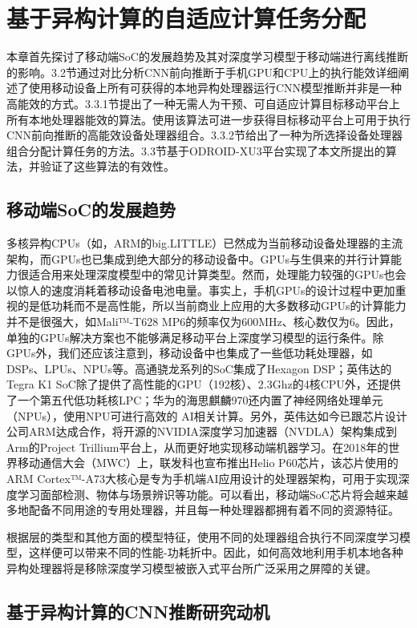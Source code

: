 \chapter{基于异构计算的自适应计算任务分配}

本章首先探讨了移动端SoC的发展趋势及其对深度学习模型于移动端进行离线推断的影响。3.2节通过对比分析CNN前向推断于手机GPU和CPU上的执行能效详细阐述了使用移动设备上所有可获得的本地异构处理器运行CNN模型推断并非是一种高能效的方式。3.3.1节提出了一种无需人为干预、可自适应计算目标移动平台上所有本地处理器能效的算法。使用该算法可进一步获得目标移动平台上可用于执行CNN前向推断的高能效设备处理器组合。3.3.2节给出了一种为所选择设备处理器组合分配计算任务的方法。3.3节基于ODROID-XU3平台实现了本文所提出的算法，并验证了这些算法的有效性。

\section{移动端SoC的发展趋势}
\label{chapter:chapter4-1}
多核异构CPUs（如，ARM的big.LITTLE\cite{chung2012heterogeneous}）已然成为当前移动设备处理器的主流架构，而GPUs也已集成到绝大部分的移动设备中。GPUs与生俱来的并行计算能力很适合用来处理深度模型中的常见计算类型。然而，处理能力较强的GPUs也会以惊人的速度消耗着移动设备电池电量。事实上，手机GPUs的设计过程中更加重视的是低功耗而不是高性能，所以当前商业上应用的大多数移动GPUs的计算能力并不是很强大，如Mali™-T628 MP6的频率仅为600MHz、核心数仅为6。因此，单独的GPUs解决方案也不能够满足移动平台上深度学习模型的运行条件。除GPUs外，我们还应该注意到，移动设备中也集成了一些低功耗处理器，如DSPs、LPUs、NPUs等。高通骁龙系列的SoC集成了Hexagon DSP；英伟达的Tegra K1 SoC除了提供了高性能的GPU（192核）、2.3Ghz的4核CPU外，还提供了一个第五代低功耗核LPC；华为的海思麒麟970还内置了神经网络处理单元（NPUs），使用NPU可进行高效的 AI相关计算。另外，英伟达如今已跟芯片设计公司ARM达成合作，将开源的NVIDIA深度学习加速器（NVDLA）架构集成到Arm的Project Trillium平台上，从而更好地实现移动端机器学习。在2018年的世界移动通信大会（MWC）上，联发科也宣布推出Helio P60芯片，该芯片使用的ARM Cortex™-A73大核心是专为手机端AI应用设计的处理器架构，可用于实现深度学习面部检测、物体与场景辨识等功能。可以看出，移动端SoC芯片将会越来越多地配备不同用途的专用处理器，并且每一种处理器都拥有着不同的资源特征。

根据层的类型和其他方面的模型特征，使用不同的处理器组合执行不同深度学习模型，这样便可以带来不同的性能-功耗折中。因此，如何高效地利用手机本地各种异构处理器将是移除深度学习模型被嵌入式平台所广泛采用之屏障的关键\cite{attia2015dynamic}。

\section{基于异构计算的CNN推断研究动机}

